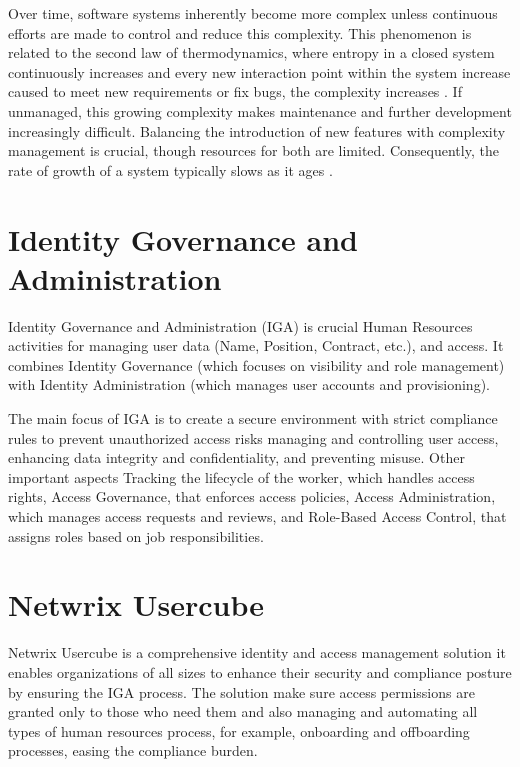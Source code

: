 Over time, software systems inherently become more complex unless continuous efforts are made to control and reduce this complexity. This phenomenon is related to the second law of thermodynamics, where entropy in a closed system continuously increases and every new interaction point within the system increase caused to meet new requirements or fix bugs, the complexity increases \cite{Lehman1996Laws}. If unmanaged, this growing complexity makes maintenance and further development increasingly difficult. Balancing the introduction of new features with complexity management is crucial, though resources for both are limited. Consequently, the rate of growth of a system typically slows as it ages \cite{Lehman1978ProgramsCS}.



\section{Identity Governance and Administration}

Identity Governance and Administration (IGA) is crucial Human Resources activities for managing user data (Name, Position, Contract, etc.), and access. It combines Identity Governance (which focuses on visibility and role management) with Identity Administration (which manages user accounts and provisioning).

The main focus of IGA is to create a secure environment with strict compliance rules to prevent unauthorized access risks managing and controlling user access, enhancing data integrity and confidentiality, and preventing misuse. Other important aspects Tracking the lifecycle of the worker, which handles access rights, Access Governance, that enforces access policies, Access Administration, which manages access requests and reviews, and Role-Based Access Control, that assigns roles based on job responsibilities.


\section{Netwrix Usercube}

Netwrix Usercube is a comprehensive identity and access management solution it enables organizations of all sizes to enhance their security and compliance posture by ensuring the IGA process. The solution make sure access permissions are granted only to those who need them and also managing and automating all types of human resources process, for example, onboarding and offboarding processes, easing the compliance burden.  

